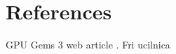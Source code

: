 \documentclass[10pt]{article}
\begin{document}
\pagebreak
\section{References}
GPU Gems 3 web article \citep{GPU_Gems_3}.
Fri ucilnica \citep{Fri_ucilnica}

\pagebreak








\clearpage
\end{document}
